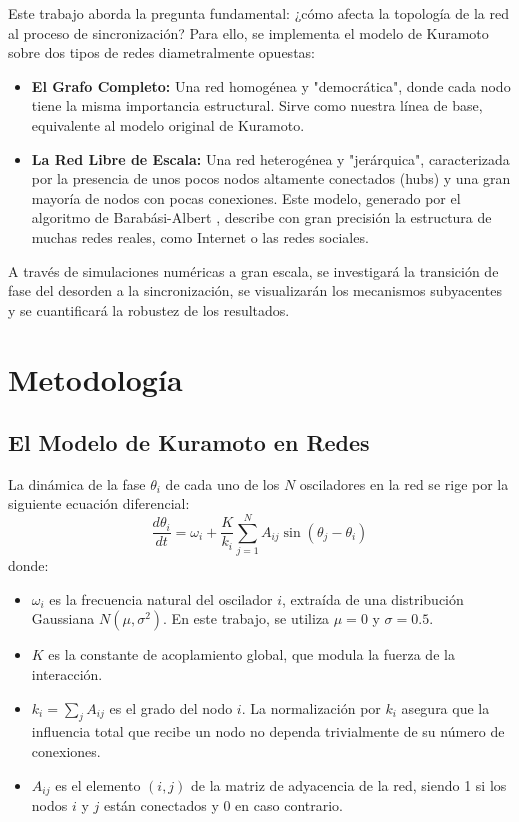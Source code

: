 \documentclass[12pt, a4paper]{article}
\begin{document}
Este trabajo aborda la pregunta fundamental: ¿cómo afecta la topología de la red al proceso de sincronización? Para ello, se implementa el modelo de Kuramoto sobre dos tipos de redes diametralmente opuestas:
\begin{itemize}
    \item \textbf{El Grafo Completo:} Una red homogénea y "democrática", donde cada nodo tiene la misma importancia estructural. Sirve como nuestra línea de base, equivalente al modelo original de Kuramoto.
    \item \textbf{La Red Libre de Escala:} Una red heterogénea y "jerárquica", caracterizada por la presencia de unos pocos nodos altamente conectados (hubs) y una gran mayoría de nodos con pocas conexiones. Este modelo, generado por el algoritmo de Barabási-Albert \cite{Barabasi1999}, describe con gran precisión la estructura de muchas redes reales, como Internet o las redes sociales.
\end{itemize}

A través de simulaciones numéricas a gran escala, se investigará la transición de fase del desorden a la sincronización, se visualizarán los mecanismos subyacentes y se cuantificará la robustez de los resultados.

\section{Metodología}

\subsection{El Modelo de Kuramoto en Redes}

La dinámica de la fase \(\theta_i\) de cada uno de los \(N\) osciladores en la red se rige por la siguiente ecuación diferencial:
$$
\frac{d\theta_i}{dt} = \omega_i + \frac{K}{k_i} \sum_{j=1}^{N} A_{ij} \sin(\theta_j - \theta_i)
$$
donde:
\begin{itemize}
    \item \(\omega_i\) es la frecuencia natural del oscilador \(i\), extraída de una distribución Gaussiana \(N(\mu, \sigma^2)\). En este trabajo, se utiliza \(\mu=0\) y \(\sigma=0.5\).
    \item \(K\) es la constante de acoplamiento global, que modula la fuerza de la interacción.
    \item \(k_i = \sum_j A_{ij}\) es el grado del nodo \(i\). La normalización por \(k_i\) asegura que la influencia total que recibe un nodo no dependa trivialmente de su número de conexiones.
    \item \(A_{ij}\) es el elemento \((i, j)\) de la matriz de adyacencia de la red, siendo 1 si los nodos \(i\) y \(j\) están conectados y 0 en caso contrario.
\end{itemize}
\end{document}
